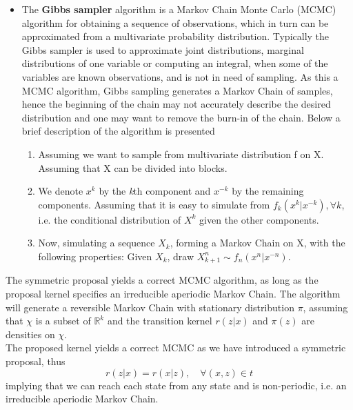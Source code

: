 \begin{itemize}
\item{The \textbf{Gibbs sampler} algorithm is a Markov Chain Monte Carlo (MCMC) algorithm for obtaining a sequence of observations, which in turn can be approximated from a multivariate probability distribution. Typically the Gibbs sampler is used to approximate joint distributions, marginal distributions of one variable or computing an integral, when some of the variables are known observations, and is not in need of sampling. As this a MCMC algorithm, Gibbs sampling generates a Markov Chain of samples, hence the beginning of the chain may not accurately describe the desired distribution and one may want to remove the burn-in of the chain. Below a brief description of the algorithm is presented

\begin{enumerate}
	\item{Assuming we want to sample from multivariate distribution f on X. Assuming that X can be divided into blocks.}
	\item{We denote $x^k$ by the \textit{k}th component and $x^{-k}$ by the remaining components. Assuming that it is easy to simulate from $f_k(x^k|x^{-k}),\forall k$, i.e. the conditional distribution of $X^k$ given the other components.}
	\item{Now, simulating a sequence $X_k$, forming a Markov Chain on X, with the following properties: Given $X_k$, draw $X_{k+1}^n \sim f_n(x^n|x^{-n})$.}
\end{enumerate}
}
\end{itemize}



The symmetric proposal yields a correct MCMC algorithm, as long as the proposal kernel specifies an irreducible aperiodic Markov Chain. The algorithm will generate a reversible Markov Chain with stationary distribution $\pi$, assuming that $\chi$ is a subset of $\mathbb{R}^k$ and the transition kernel $r(z|x)$ and $\pi(z)$ are densities on $\chi$. \\

The proposed kernel yields a correct MCMC as we have introduced a symmetric proposal, thus
\begin{equation}
r(z|x)=r(x|z), \quad \forall (x,z) \in t
\end{equation}
implying that we can reach each state from any state and is non-periodic, i.e. an irreducible aperiodic Markov Chain.
